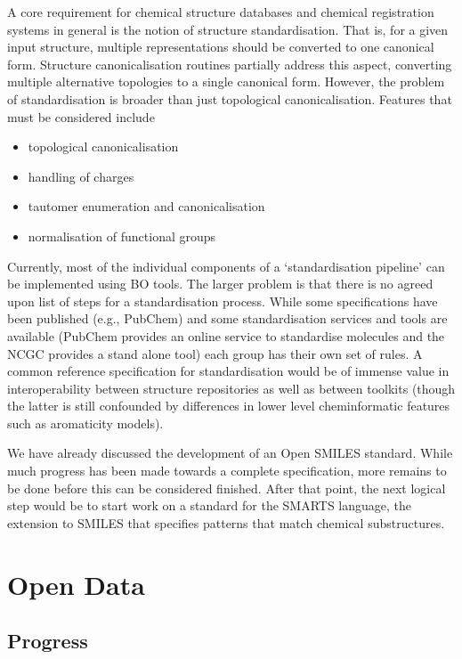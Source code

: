 \documentclass[10pt]{bmc_article}
\newenvironment{bmcformat}{\begin{raggedright}\baselineskip20pt\sloppy\setboolean{publ}{false}}{\end{raggedright}\baselineskip20pt\sloppy}
\begin{document}
\begin{bmcformat}
A core requirement for chemical structure databases and chemical
registration systems in general is the notion of structure
standardisation.  That is,  for a given input structure, multiple
representations should be converted to one canonical form. 
Structure canonicalisation routines partially address this aspect,
converting multiple alternative topologies to a single canonical
form. However, the problem of standardisation is broader than just
topological canonicalisation. Features that must be considered include
\begin{itemize}
\item topological canonicalisation
\item handling of charges
\item tautomer enumeration and canonicalisation
\item normalisation of functional groups
\end{itemize}
Currently, most of the individual components of a `standardisation
pipeline' can be implemented using BO tools. The larger problem is
that there is no agreed upon list of steps for a standardisation
process. While some specifications have been published (e.g., PubChem)
and some standardisation services and tools are available (PubChem
provides an online service to standardise molecules and the NCGC
provides a stand alone tool) each group has their own set of rules. A
common reference specification for standardisation would be of immense
value in interoperability between structure repositories as well as
between toolkits (though the latter is still confounded by differences
in lower level cheminformatic features such as aromaticity models).

We have already discussed the development of an Open SMILES standard.
While much progress has been made towards a complete specification,
more remains to be done before this can be considered finished. After
that point, the next logical step would be to start work on a standard
for the SMARTS language, the extension to SMILES that specifies
patterns that match chemical substructures.

\section*{Open Data}
  \subsection*{Progress}


\end{bmcformat}
\end{document}
